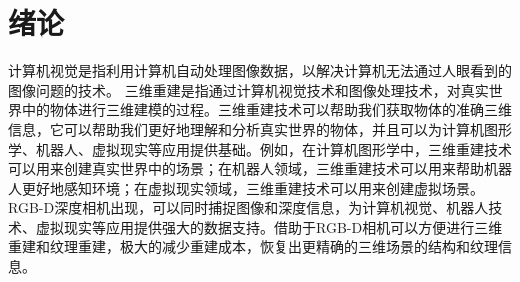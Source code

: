 \chapter{绪论}
计算机视觉是指利用计算机自动处理图像数据，以解决计算机无法通过人眼看到的图像问题的技术。
三维重建是指通过计算机视觉技术和图像处理技术，对真实世界中的物体进行三维建模的过程。三维重建技术可以帮助我们获取物体的准确三维信息，它可以帮助我们更好地理解和分析真实世界的物体，并且可以为计算机图形学、机器人、虚拟现实等应用提供基础。例如，在计算机图形学中，三维重建技术可以用来创建真实世界中的场景；在机器人领域，三维重建技术可以用来帮助机器人更好地感知环境；在虚拟现实领域，三维重建技术可以用来创建虚拟场景。RGB-D深度相机出现，可以同时捕捉图像和深度信息，为计算机视觉、机器人技术、虚拟现实等应用提供强大的数据支持。借助于RGB-D相机可以方便进行三维重建和纹理重建，极大的减少重建成本，恢复出更精确的三维场景的结构和纹理信息。



